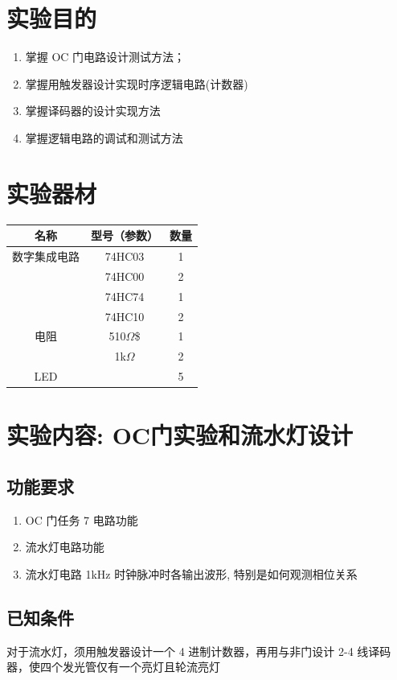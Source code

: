 \documentclass[a4paper,11pt,UTF8]{article}
\begin{document}
\tableofcontents
\section{实验目的}
\begin{enumerate}
	\item 掌握 OC 门电路设计测试方法；
	\item 掌握用触发器设计实现时序逻辑电路(计数器)
	\item 掌握译码器的设计实现方法
	\item 掌握逻辑电路的调试和测试方法
\end{enumerate}
\section{实验器材}
\begin{table}[!ht]
	\centering
	\begin{tabular}{|c|c|c|}
		\hline
		名称 & 型号（参数） & 数量 \\ \hline
		数字集成电路 & 74HC03 & 1 \\ 
		~ & 74HC00 & 2 \\ 
		~ & 74HC74 & 1 \\ 
		~ & 74HC10 & 2 \\ 
		电阻 & 510$\Omega$\$ & 1 \\ 
		~ & 1k$\Omega$ & 2 \\ 
		LED & ~ & 5 \\ \hline
	\end{tabular}
\end{table}
\section{实验内容: OC门实验和流水灯设计}
\subsection{功能要求}
\begin{enumerate}
	\item OC 门任务 7 电路功能
	\item 流水灯电路功能
	\item 流水灯电路 1kHz 时钟脉冲时各输出波形, 特别是如何观测相位关系
\end{enumerate}
\subsection{已知条件}
对于流水灯，须用触发器设计一个 4 进制计数器，再用与非门设计 2-4 线译码器，使四个发光管仅有一个亮灯且轮流亮灯
\end{document}
